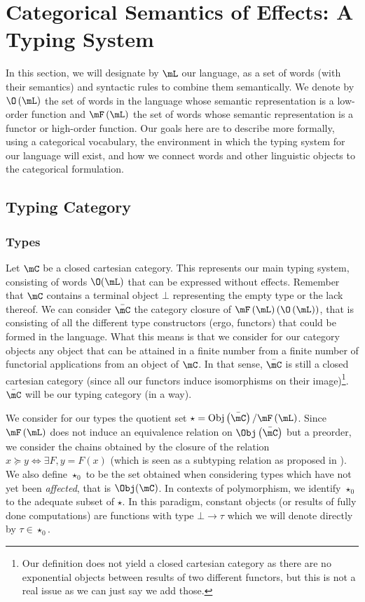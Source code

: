 \section{Categorical Semantics of Effects: A Typing System}
\label{sec:typingsystem}
In this section, we will designate by $\mL$ our language, as a set of words (with their semantics) and syntactic rules to combine them semantically.
We denote by $\O\left( \mL \right)$ the set of words in the language whose semantic representation is a low-order function and $\mF\left( \mL \right)$ the set of words whose semantic representation is a functor or high-order function.
Our goals here are to describe more formally, using a categorical vocabulary, the environment in which the typing system for our language will exist, and how we connect words and other linguistic objects to the categorical formulation.

\subsection{Typing Category}\label{subsec:typingcategory}
\subsubsection{Types}\label{subsubsec:types}
Let $\mC$ be a closed cartesian category. This represents our main typing system, consisting of words $\O(\mL)$ that can be expressed without effects.
Remember that $\mC$ contains a terminal object $\bot$ representing the empty type or the lack thereof.
We can consider $\bar{\mC}$ the category closure of $\mF\left( \mL \right)\left(\O\left( \mL \right)\right)$, that is consisting of all the different type constructors (ergo, functors) that could be formed in the language.
What this means is that we consider for our category objects any object that can be attained in a finite number from a finite number of functorial applications from an object of $\mC$.
In that sense, $\bar{\mC}$ is still a closed cartesian category (since all our functors induce isomorphisms on their image)\footnote{Our definition does not yield a closed cartesian category as there are no exponential objects between results of two different functors, but this is not a real issue as we can just say we add those.}.
$\bar{\mC}$ will be our typing category (in a way).

We consider for our types the quotient set $\star = \mathrm{Obj}\left( \bar{\mC} \right)/\mF\left( \mL \right)$.
Since $\mF\left( \mL \right)$ does not induce an equivalence relation on $\Obj\left( \bar{\mC} \right)$ but a preorder, we consider the chains obtained by the closure of the relation $x\succeq y \Leftrightarrow \exists F, y = F(x)$ (which is seen as a subtyping relation as proposed in ).
We also define $\star_{0}$ to be the set obtained when considering types which have not yet been \emph{affected}, that is $\Obj(\mC)$.
In contexts of polymorphism, we identify $\star_{0}$ to the adequate subset of $\star$.
In this paradigm, constant objects (or results of fully done computations) are functions with type $\bot \to \tau$ which we will denote directly by $\tau \in \star_{0}$.

